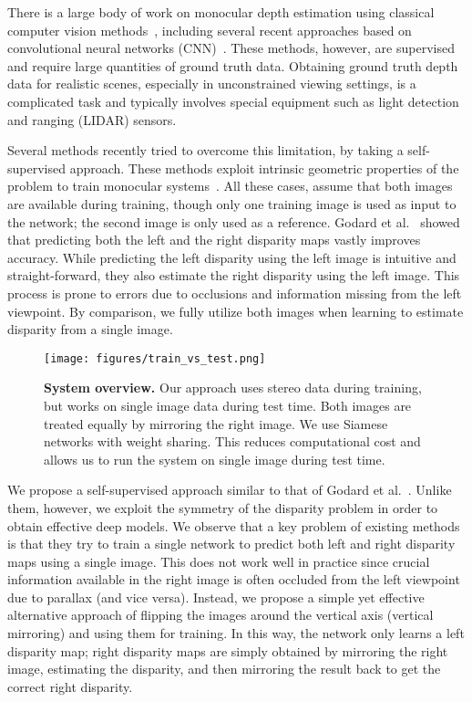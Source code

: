 \documentclass[10pt,twocolumn,letterpaper]{article}
\begin{document}
There is a large body of work on monocular depth estimation using classical computer vision methods~\cite{blanz1999morphable,criminisi2000single,saxena2006learning,saxena2007depth}, including several recent approaches based on convolutional neural networks (CNN)~\cite{eigen2014depth,liu2016learning}. These methods, however, are supervised and require large quantities of ground truth data. Obtaining ground truth depth data for realistic scenes, especially in unconstrained viewing settings, is a complicated task and typically involves special equipment such as light detection and ranging (LIDAR) sensors.

Several methods recently tried to overcome this limitation, by taking a self-supervised approach. These  methods exploit intrinsic geometric properties of the problem to train monocular systems~\cite{garg2016unsupervised,monodepth17}. All these cases, assume that both images are available during training, though only one training image is used as input to the network; the second image is only used as a reference. Godard et al.~\cite{monodepth17} showed that predicting both the left and the right disparity maps vastly improves accuracy. While predicting the left disparity using the left image is intuitive and straight-forward, they also estimate the right disparity using the left image. This process is prone to errors due to occlusions and information missing from the left viewpoint. By comparison, we  fully utilize both images when learning to estimate disparity from a single image.

\begin{figure*}[t]
	\centering
	\texttt{[image: figures/train\_vs\_test.png]}
	\vspace{0.1in}
	\caption{{\bf System overview.} Our approach uses stereo data during training, but works on single image data during test time. Both images are treated equally by mirroring the right image. We use Siamese \cite{bromley1994signature} networks with weight sharing. This reduces computational cost and allows us to run the system on single image during test time.}
	\label{fig:train_vs_test}
\end{figure*}


We propose a self-supervised approach similar to that of Godard et al.~\cite{monodepth17}. Unlike them, however, we exploit the symmetry of the disparity problem in order to obtain effective deep models. We observe that a key problem of existing methods is that they try to train a single network to predict both left and right disparity maps using a single image. This does not work well in practice since crucial information available in the right image is often occluded from the left viewpoint due to parallax (and vice versa). Instead, we propose a simple yet effective alternative approach of flipping the images around the vertical axis (vertical mirroring) and using them for training. In this way, the network only learns a left disparity map; right disparity maps are simply obtained by mirroring the right image, estimating the disparity, and then mirroring the result back to get the correct right disparity.
\end{document}
